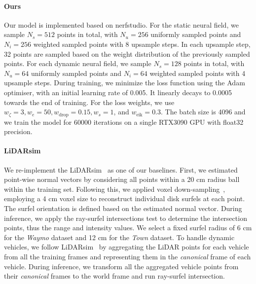 \paragraph{Ours} 
Our model is implemented based on nerfstudio\cite{nerfstudio}. For the static neural field, we sample $N_s=512$ points in total, with $N_u=256$ uniformly sampled points and $N_i=256$ weighted sampled points with 8 upsample steps. In each upsample step, 32 points are sampled based on the weight distribution of the previously sampled points. For each dynamic neural field, we sample $N_s=128$ points in total, with $N_u=64$ uniformly sampled points and $N_i=64$ weighted sampled points with 4 upsample steps. During training, we minimize the loss function using the Adam~\cite{kingma2014adam} optimiser, with an initial learning rate of 0.005. It linearly decays to 0.0005 towards the end of training. For the loss weights, we use $w_{\zeta}=3, w_{e}=50, w_{\text{drop}}=0.15, w_{s}=1$, and  $w_{\text{eik}}=0.3$. The batch size is 4096 and we train the model for 60000 iterations on a single RTX3090 GPU with float32 precision.

\paragraph{LiDARsim} We re-implement the LiDARsim~\cite{manivasagam2020lidarsim} as one of our baselines. 
First, we estimated point-wise normal vectors by considering all points within a 20 cm radius ball within the training set. Following this, we applied voxel down-sampling~\cite{tang2022torchsparse}, employing a 4 cm voxel size to reconstruct individual disk surfels at each point. The surfel orientation is defined based on the estimated normal vector. During inference, we apply the ray-surfel intersections test to determine the intersection points, thus the range and intensity values. We select a fixed surfel radius of 6 cm for the \textit{Waymo} dataset and 12 cm for the \textit{Town} dataset.
To handle dynamic vehicles, we follow LiDARsim~\cite{manivasagam2020lidarsim} by aggregating the LiDAR points for each vehicle from all the training frames and representing them in the \textit{canonical} frame of each vehicle. During inference, we transform all the aggregated vehicle points from their \textit{canonical} frames to the world frame and run ray-surfel intersection.

